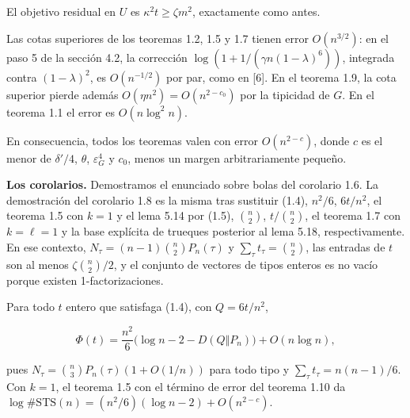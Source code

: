 \documentclass[spanish,11pt,a4paper]{article}
\begin{document}
El objetivo residual en \(U\) es \(\kappa^2t\ge\zeta m^2\), exactamente como antes.

Las cotas superiores de los teoremas 1.2, 1.5 y 1.7 tienen error \(O(n^{3/2})\): en el paso 5 de la sección 4.2, la corrección \(\log(1+1/(\gamma n(1-\lambda)^6))\), integrada contra \((1-\lambda)^2\), es \(O(n^{-1/2})\) por par, como en {[}6{]}. En el teorema 1.9, la cota superior pierde además \(O(\eta n^2)=O(n^{2-c_0})\) por la tipicidad de \(G\). En el teorema 1.1 el error es \(O(n\log^2n)\).

En consecuencia, todos los teoremas valen con error \(O(n^{2-c})\), donde \(c\) es el menor de \(\delta'/4\), \(\theta\), \(\varepsilon_G^4\) y \(c_0\), menos un margen arbitrariamente pequeño.

\textbf{Los corolarios.} Demostramos el enunciado sobre bolas del corolario 1.6. La demostración del corolario 1.8 es la misma tras sustituir (1.4), \(n^2/6\), \(6t/n^2\), el teorema 1.5 con \(k=1\) y el lema 5.14 por (1.5), \(\binom n2\), \(t/\binom n2\), el teorema 1.7 con \(k=\ell=1\) y la base explícita de trueques posterior al lema 5.18, respectivamente. En ese contexto, \(N_\tau=(n-1)\binom n2P_n(\tau)\) y \(\sum_\tau t_\tau=\binom n2\), las entradas de \(t\) son al menos \(\zeta\binom n2/2\), y el conjunto de vectores de tipos enteros es no vacío porque existen 1-factorizaciones.

Para todo \(t\) entero que satisfaga (1.4), con \(Q=6t/n^2\),

\nopagebreak[4]
\[\Phi(t)=\frac{n^2}{6}\bigl(\log n-2-D(Q\Vert P_n)\bigr)+O(n\log n),\]

pues \(N_\tau=\binom n3P_n(\tau)(1+O(1/n))\) para todo tipo y \(\sum_\tau t_\tau=n(n-1)/6\). Con \(k=1\), el teorema 1.5 con el término de error del teorema 1.10 da \(\log\#\mathrm{STS}(n)=(n^2/6)(\log n-2)+O(n^{2-c})\).
\end{document}
